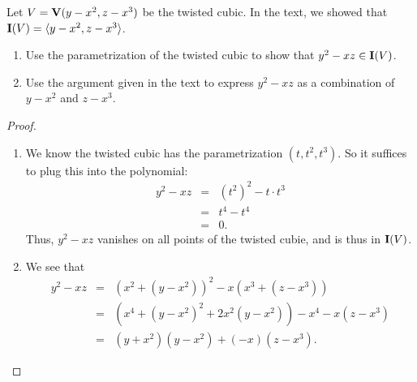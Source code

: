 \begin{exercise}{9}
Let $V = \mathbf{V}(y-x^2, z-x^3)$ be the twisted cubic. In the text, we showed that $\mathbf{I}(V) = \langle y-x^2, z-x^3\rangle$.
\begin{enumerate}
    \item Use the parametrization of the twisted cubic to show that $y^2 - xz\in \mathbf{I}(V)$.
    \item Use the argument given in the text to express $y^2 - xz$ as a combination of $y-x^2$ and $z-x^3$.
\end{enumerate}
\end{exercise}
\begin{proof}
    \begin{enumerate}
        \item We know the twisted cubic has the parametrization $(t,t^2,t^3)$. So it suffices to plug this into the polynomial:
        \begin{eqnarray*}
            y^2 - xz
            & = & (t^2)^2 - t\cdot t^3\\
            & = & t^4 - t^4\\
            & = & 0.
        \end{eqnarray*}
        Thus, $y^2 - xz$ vanishes on all points of the twisted cubie, and is thus in $\mathbf{I}(V)$.
        \item We see that
        \begin{eqnarray*}
            y^2 - xz
            & = & (x^2 + (y-x^2))^2 - x(x^3 + (z-x^3))\\
            & = & (x^4 + (y-x^2)^2 + 2x^2(y-x^2) ) - x^4 - x(z-x^3)\\
            & = & (y+x^2)(y-x^2) + (-x)(z-x^3).
        \end{eqnarray*}
    \end{enumerate}
\end{proof}

